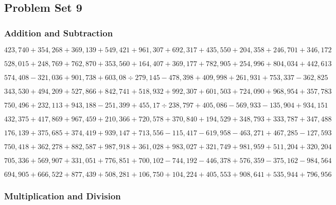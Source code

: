 \hypertarget{problem-set-9-5}{%
\subsection{Problem Set 9}\label{problem-set-9-5}}

\hypertarget{addition-and-subtraction-314}{%
\subsubsection{Addition and
Subtraction}\label{addition-and-subtraction-314}}

\(423,740+354,268+369,139+549,421+961,307+692,317+435,550+204,358+246,701+ 346,172\)

\(528,015+248,769+762,870+353,560+164,407+369,177+782,905+254,996+804,034+442,613\)

\(574,408-321,036+901,738+603,08÷279,145-478,398+409,998+261,931+753,337-362,825\)

\(343,530+494,209+527,866+842,741+518,932+992,307+601,503+724,090+968,954+357,783\)

\(750,496+232,113+943,188-251,399+455,17÷238,797+405,086-569,933-135,904+934,151\)

\(432,375+417,869+967,459+210,366+720,578+370,840+194,529+348,793+333,787+347,488\)

\(176,139+375,685+374,419+939,147+713,556-115,417-619,958-463,271+467,285-127,593\)

\(750,418+362,278+882,587+987,918+361,028+983,027+321,749+981,959+511,204+320,204\)

\(705,336+569,907+331,051+776,851+700,102-744,192-446,378+576,359-375,162-984,564\)

\(694,905+666,522+877,439+508,281+106,750+104,224+405,553+908,641+535,944+796,956\)

\hypertarget{multiplication-and-division-313}{%
\subsubsection{Multiplication and
Division}\label{multiplication-and-division-313}}


